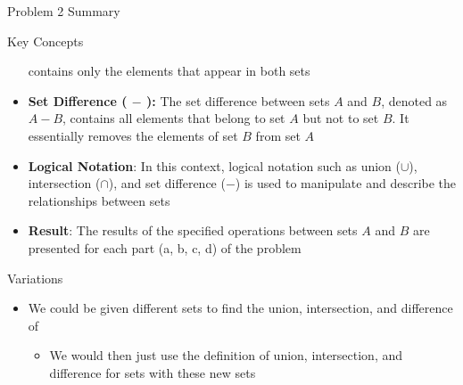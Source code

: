 \begin{summary}{Problem 2 Summary}
\begin{statement}{Key Concepts}
\begin{itemize}
            contains only the elements that appear in both sets
            \item \textbf{Set Difference ( $-$ ):} The set difference between sets $A$ and $B$, denoted as $A - B$, contains all elements that belong to set $A$ but not to set $B$. It essentially 
            removes the elements of set $B$ from set $A$
            \item \textbf{Logical Notation}: In this context, logical notation such as union ($\cup$), intersection ($\cap$), and set difference ($-$) is used to manipulate and describe the relationships 
            between sets
            \item \textbf{Result}: The results of the specified operations between sets $A$ and $B$ are presented for each part (a, b, c, d) of the problem
        \end{itemize}
    \end{statement}
    \begin{statement}{Variations}
        \begin{itemize}
            \item We could be given different sets to find the union, intersection, and difference of
            \begin{itemize}
                \item We would then just use the definition of union, intersection, and difference for sets with these new sets
            \end{itemize}
        \end{itemize}
    \end{statement}
\end{summary}

